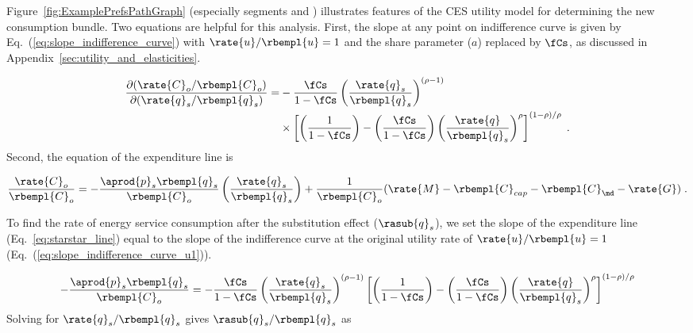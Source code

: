 Figure~\ref{fig:ExamplePrefsPathGraph} 
(especially segments \starc{} and \chat{})
illustrates features
of the CES utility model for determining the new consumption bundle.
Two equations are helpful for this analysis.
First, the slope at any point on indifference curve \iicirc{} 
is given by Eq.~(\ref{eq:slope_indifference_curve}) with 
$\rate{u}/\rbempl{u} = 1$ and 
the share parameter ($a$) replaced by $\fCs$,
as discussed in Appendix~\ref{sec:utility_and_elasticities}.

\begin{align} \label{eq:slope_indifference_curve_u1}
  \frac{\partial (\rate{C}_o/\rbempl{C}_o)}{\partial (\rate{q}_s/\rbempl{q}_s)} =&
        -\frac{\fCs}{1 - \fCs} \left( \frac{\rate{q}_s}{\rbempl{q}_s} \right)^{(\rho -1)} \nonumber  \\
        &\times \left[ \left( \frac{1}{1 - \fCs} \right) 
                - \left( \frac{\fCs}{1 - \fCs} \right) 
                          \left( \frac{\rate{q}}{\rbempl{q}_s} \right)^\rho \right]^{(1 - \rho)/\rho} \; .
\end{align}
%
Second, the equation of the \starstar{} expenditure line is

\begin{equation} \label{eq:starstar_line}
  \frac{\rate{C}_o}{\rbempl{C}_o} = 
      -\frac{\aprod{p}_s \rbempl{q}_s}
            {\rbempl{C}_o}
        \left(  \frac{\rate{q}_s}{\rbempl{q}_s} \right)
      + \frac{1}{\rbempl{C}_o} 
        (\rate{M} - \rbempl{C}_{cap} - \rbempl{C}_{\md} - \rate{G}) \; .
\end{equation}

To find the rate of energy service consumption after the substitution effect
($\rasub{q}_s$), we set the slope of the \starstar{} expenditure line (Eq.~\ref{eq:starstar_line})
equal to the slope of the \iicirc{} indifference curve 
at the original utility rate of $\rate{u}/\rbempl{u} = 1$ (Eq.~(\ref{eq:slope_indifference_curve_u1})).

\begin{equation}
  -\frac{\aprod{p}_s \rbempl{q}_s}
        {\rbempl{C}_o} = 
    -\frac{\fCs}{1 - \fCs} \left( \frac{\rate{q}_s}{\rbempl{q}_s} \right)^{(\rho -1)} %
        \left[ \left( \frac{1}{1 - \fCs} \right) 
                - \left( \frac{\fCs}{1 - \fCs} \right) 
                          \left( \frac{\rate{q}}{\rbempl{q}_s} \right)^\rho \right]^{(1 - \rho)/\rho}
\end{equation}
%
Solving for $\rate{q}_s/\rbempl{q}_s$ gives $\rasub{q}_s/\rbempl{q}_s$ as

